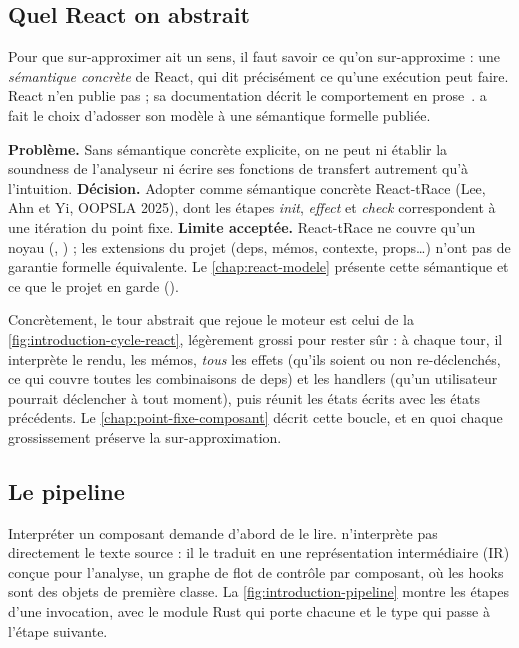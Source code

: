 \subsection{Quel React on abstrait}

Pour que \og sur-approximer\fg{} ait un sens, il faut savoir ce qu'on
sur-approxime : une \emph{sémantique concrète} de React, qui dit précisément
ce qu'une exécution peut faire. React n'en publie pas ; sa documentation décrit
le comportement en prose~\cite{ReactDocs}. \reactant{} a fait le choix
d'adosser son modèle à une sémantique formelle publiée.

\begin{decision}[ADR-001]
  \textbf{Problème.} Sans sémantique concrète explicite, on ne peut ni établir
  la soundness de l'analyseur ni écrire ses fonctions de transfert autrement
  qu'à l'intuition. \textbf{Décision.} Adopter comme sémantique concrète
  React-tRace (Lee, Ahn et Yi, OOPSLA 2025), dont les étapes \emph{init},
  \emph{effect} et \emph{check} correspondent à une itération du point fixe.
  \textbf{Limite acceptée.} React-tRace ne couvre qu'un noyau
  (, ) ; les extensions du projet (deps,
  mémos, contexte, props\dots) n'ont pas de garantie formelle équivalente.
  Le \cref{chap:react-modele} présente cette sémantique et ce que le projet
  en garde ().
\end{decision}

Concrètement, le tour abstrait que rejoue le moteur est celui de la
\cref{fig:introduction-cycle-react}, légèrement grossi pour rester sûr : à
chaque tour, il interprète le rendu, les mémos, \emph{tous} les effets (qu'ils
soient ou non re-déclenchés, ce qui couvre toutes les combinaisons de deps) et
les handlers (qu'un utilisateur pourrait déclencher à tout moment), puis réunit
les états écrits avec les états précédents. Le \cref{chap:point-fixe-composant}
décrit cette boucle, et en quoi chaque grossissement préserve la
sur-approximation.

\subsection{Le pipeline}

Interpréter un composant demande d'abord de le lire. \reactant{} n'interprète
pas directement le texte source : il le traduit en une représentation
intermédiaire (IR) conçue pour l'analyse, un graphe de flot de contrôle par
composant, où les hooks sont des objets de première classe. La
\cref{fig:introduction-pipeline} montre les étapes d'une invocation, avec le
module Rust qui porte chacune et le type qui passe à l'étape suivante.

